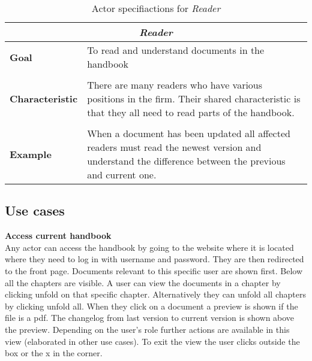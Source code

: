 \begin{table}[H]
	\begin{tabular}{l m{11.3cm}}
		\hline
		\multicolumn{2}{c}{\textbf{\textit{Reader}}}\\
		\hline
		\textbf{Goal} & To read and understand documents in the handbook \\
		 &  \\
		\textbf{Characteristic} & There are many readers who have various positions in the firm. Their shared characteristic is that they all need to read parts of the handbook. \\
		 &  \\
		\textbf{Example} & When a document has been updated all affected readers must read the newest version and understand the difference between the previous and current one. \\
		\hline
	\end{tabular}
	\caption{Actor specifiactions for \textit{Reader}}\label{tab:Actor-read}
\end{table}

\subsection{Use cases} \label{sec:usecases}



\textbf{Access current handbook}
\\
Any actor can access the handbook by going to the website where it is located where they need to log in with username and password.
They are then redirected to the front page.
Documents relevant to this specific user are shown first.
Below all the chapters are visible.
A user can view the documents in a chapter by clicking unfold on that specific chapter.
Alternatively they can unfold all chapters by clicking unfold all.
When they click on a document a preview is shown if the file is a pdf.
The changelog from last version to current version is shown above the preview.
Depending on the user's role further actions are available in this view (elaborated in other use cases).
To exit the view the user clicks outside the box or the x in the corner.


